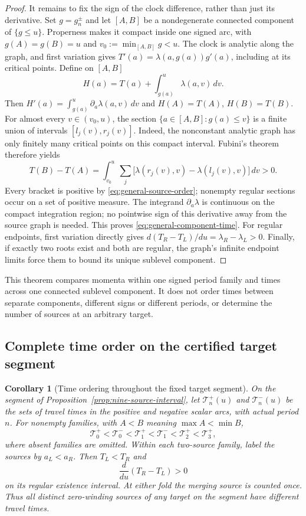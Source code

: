 \documentclass[11pt,a4paper]{article}
\newtheorem{corollary}[theorem]{Corollary}
\theoremstyle{remark}\newtheorem{remark}[theorem]{Remark}
\begin{document}
\begin{proof}
It remains to fix the sign of the clock difference, rather than just
its derivative. Set $g=g_n^\pm$ and let $[A,B]$ be a nondegenerate
connected component of $\{g\le u\}$. Properness makes it compact inside
one signed arc, with $g(A)=g(B)=u$ and $v_0:=\min_{[A,B]}g<u$.
The clock is analytic along the graph, and first variation gives
$T'(a)=\lambda(a,g(a))g'(a)$, including at its critical points.
Define on $[A,B]$
\[
 H(a)=T(a)+\int_{g(a)}^u\lambda(a,v)\,dv.
\]
Then $H'(a)=\int_{g(a)}^u\partial_a\lambda(a,v)\,dv$ and
$H(A)=T(A)$, $H(B)=T(B)$. For almost every $v\in(v_0,u)$,
the section $\{a\in[A,B]:g(a)\le v\}$ is a finite union of intervals
$[l_j(v),r_j(v)]$. Indeed, the nonconstant analytic graph has only
finitely many critical points on this compact interval. Fubini's theorem
therefore yields
\begin{equation}\label{eq:component-horizontal-slices}
 T(B)-T(A)=\int_{v_0}^u\sum_j
 \bigl[\lambda(r_j(v),v)-\lambda(l_j(v),v)\bigr]\,dv>0.
\end{equation}
Every bracket is positive by \eqref{eq:general-source-order}; nonempty
regular sections occur on a set of positive measure. The integrand
$\partial_a\lambda$ is continuous on the compact integration region;
no pointwise sign of this derivative away from the source graph is needed.
This proves \eqref{eq:general-component-time}. For regular endpoints,
first variation directly gives $d(T_R-T_L)/du=\lambda_R-\lambda_L>0$.
Finally, if exactly two roots exist and both are regular, the graph's
infinite endpoint limits force them to bound its unique sublevel component.
\end{proof}

This theorem compares momenta within one signed period family and times
across one connected sublevel component. It does not order times between
separate components, different signs or different periods, or determine
the number of sources at an arbitrary target.

\subsection{Complete time order on the certified target segment}

\begin{corollary}[Time ordering throughout the fixed target segment]
\label{thm:line-time-order}
On the segment of Proposition~\ref{prop:nine-source-interval}, let
$\mathcal T_n^+(u)$ and $\mathcal T_n^-(u)$ be the sets of travel times
in the positive and negative scalar arcs, with actual period $n$.
For nonempty families, with $A<B$ meaning $\max A<\min B$,
\begin{equation}\label{eq:line-family-order}
 \mathcal T_0^+<\mathcal T_0^-<\mathcal T_1^+
 <\mathcal T_1^-<\mathcal T_2^+<\mathcal T_3^+,
\end{equation}
where absent families are omitted. Within each two-source family,
label the sources by $a_L<a_R$. Then $T_L<T_R$ and
\[
 \frac{d}{du}(T_R-T_L)>0
\]
on its regular existence interval. At either fold the merging source is
counted once. Thus all distinct zero-winding sources of any target on
the segment have different travel times.
\end{corollary}
\end{document}
